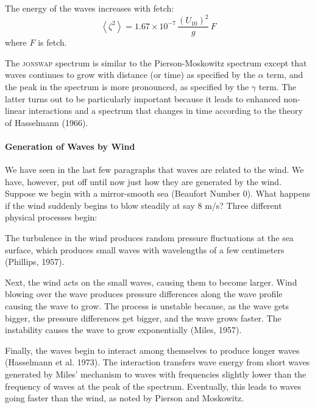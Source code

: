 The energy of the waves increases with fetch:
\begin{equation}
\left< \zeta ^{2}\right> = 1.67 \times 10^{-7}\, \frac{\left( U_{10} \right)^{2} }{g}  \, F
\end{equation}
where $F$ is fetch.

The \textsc{jonswap} spectrum is similar to the Pierson-Moskowitz
spectrum except that waves continues to grow with distance (or time)
as specified by the $\alpha$ term, and the peak in the spectrum is
more pronounced, as specified by the $\gamma$ term. The latter turns
out to be particularly important because it leads to enhanced
non-linear interactions and a spectrum that changes in time according
to the theory of Hasselmann (1966).

\paragraph{Generation of Waves by Wind}
We
have seen in the last few paragraphs that waves are related to the
wind. We have, however, put off until now just how they are generated
by the wind. Suppose we begin with a mirror-smooth sea (Beaufort
Number 0). What happens if the wind suddenly begins to blow steadily
at say 8 m/s? Three different physical processes begin:

\begin{enumerate}
\vitem The turbulence in the wind
produces random pressure fluctuations at the sea surface, which
produces small waves with wavelengths of a few centimeters (Phillips,
1957).

\vitem Next, the wind acts on the small waves, causing them to become
larger. Wind blowing over the wave produces pressure differences along
the wave profile causing the wave to grow. The process is unstable
because, as the wave gets bigger, the pressure differences get bigger,
and the wave grows faster. The instability causes the wave to grow
exponentially (Miles, 1957).

\vitem Finally, the waves begin to interact among themselves to
produce longer waves (Hasselmann et al. 1973). The interaction
transfers wave energy from short waves generated by Miles' mechanism
to waves with frequencies slightly lower than the frequency of waves
at the peak of the spectrum.  Eventually, this leads to waves going
faster than the wind, as noted by Pierson and Moskowitz.

\end{enumerate}

